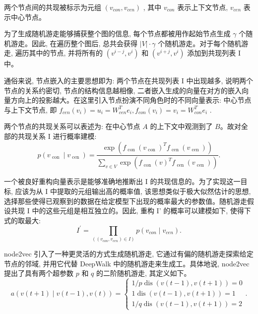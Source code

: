 两个节点间的共现被标示为元组 \(\left( {{{v}}_{{{con}}}, {{v}}_{{{cen}}}}\right)\) , 其中 \({{v}}_{{{con}}}\) 表示上下文节点, \({{v}}_{{{cen}}}\) 表示中心节点。

为了生成随机游走能够捕获整个图的信息, 每个节点都被用作起始节点生成 \(\gamma\) 个随机游走。因此, 在遍历整个图后, 总共会获得 \(\left| V\right|  \cdot  \gamma\) 个随机游走。对于每个随机游走, 遍历其中的节点, 并将所有的 \(\left( {{{v}}^{{i} - {j}}, {{v}}^{{i}}}\right)\) 和 \(\left( {{{v}}^{{i} + {j}}, {{v}}^{{i}}}\right)\) 添加到共现列表 I 中。

通俗来说, 节点嵌入的主要思想即为: 两个节点在共现列表 I 中出现越多, 说明两个节点的关系约密切, 节点的结构信息越相像, 二者嵌入生成的向量在对方的嵌入向量方向上的投影越大。在这里引入节点扮演不同角色时的不同向量表示: 中心节点与上下文节点, 即 \({{f}}_{{{cen}}}\left( {{v}}_{{i}}\right)  = {{u}}_{{i}} = {{W}}_{{{cen}}}^{{T}}{{e}}_{{i}}, {{f}}_{{{con}}}\left( {{v}}_{{i}}\right)  = {{v}}_{{i}} = {{W}}_{{{con}}}^{{T}}{{e}}_{{i}}\) .

两个节点的共现关系可以表述为: 在中心节点 \({A}\) 的上下文中观测到了 \({B}\)。故对全部的共现关系 I 进行概率建模:
\begin{equation}
p\left( {{v}_{\text{ con }} \mid  {v}_{\text{ cen }}}\right)  = \frac{\exp \left( {{f}_{\text{ con }}{\left( {v}_{\text{ con }}\right) }^{T}{f}_{\text{ cen }}\left( {v}_{\text{ cen }}\right) }\right) }{\mathop{\sum }\limits_{{v \in  V}}\exp \left( {{f}_{\text{ con }}{\left( v\right) }^{T}{f}_{\text{ cen }}\left( {v}_{\text{ cen }}\right) }\right) }.
\end{equation}

一个被良好重构向量表示是能够准确地推断出 I 的共现信息的。为了实现这一目标, 应该为从 I 中提取的元组输出高的概率值, 该思想类似于极大似然估计的思想, 选择那些使得已观察到的数据在给定模型下出现的概率最大的参数值。随机游走假设共现 I 中的这些元组是相互独立的。因此, 重构 I' 的概率可以建模如下, 使得下式的取最大:
\begin{equation}
{{I}}^{\prime } = \mathop{\prod }\limits_{\left( \left( {{v}}_{{{con}}}, {{v}}_{{{cen}}}\right)  \in  {I}\right) }{p}\left( {{{v}}_{{{con}}} \mid  {{v}}_{{{cen}}}}\right).
\end{equation}

node2vec 引入了一种更灵活的方式生成随机游走, 它通过有偏的随机游走探索给定节点的邻域, 并用它代替 DeepWalk 中的随机游走来生成工。具体地说, node2vec 提出了具有两个超参数 \({p}\) 和 \({q}\) 的二阶随机游走, 其定义如下。
\begin{equation}
a\left( {v\left( {t + 1}\right)  \mid  v\left( {t - 1}\right) , v\left( t\right) }\right)  = \left\{  \begin{matrix} 1/p\operatorname{dis}\left( {v\left( {t - 1}\right) , v\left( {t + 1}\right) }\right)  = 0 \\  1\operatorname{dis}\left( {v\left( {t - 1}\right) , v\left( {t + 1}\right) }\right)  = 1 \\  1/q\operatorname{dis}\left( {v\left( {t - 1}\right) , v\left( {t + 1}\right) }\right)  = 2 \end{matrix}\right. .
\end{equation}

